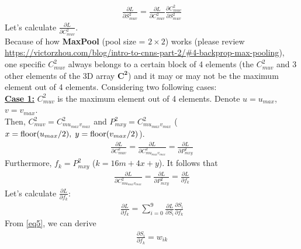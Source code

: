 \documentclass[a4paper,12pt]{article}
\begin{document}
\begin{equation}
\begin{aligned}
\frac{\partial{L}}{\partial{S^2_{muv}}} = \frac{\partial{L}}{\partial{C^2_{muv}}}\frac{\partial{C^2_{muv}}}{\partial{S^2_{muv}}} \label{eq32}
\end{aligned}
\end{equation}
Let's calculate $\frac{\partial{L}}{\partial{C^2_{muv}}}$.\\
Because of how \textbf{MaxPool} (pool size = $2\times2$) works (please review \url{https://victorzhou.com/blog/intro-to-cnns-part-2/#4-backprop-max-pooling}), one specific $C^2_{muv}$ always belongs to a certain block of 4 elements (the $C^2_{muv}$ and 3 other elements of the 3D array $\boldsymbol{C^2}$) and it may or may not be the maximum element out of 4 elements. Considering two following cases:\\[0.5cm]
\underline{\textbf{Case 1:}} $C^2_{muv}$ is the maximum element out of 4 elements. Denote $u = u_{max}$, $v = v_{max}$.\\ 
Then, $C^2_{muv} = C^2_{mu_{max}v_{max}}$ and $P^2_{mxy} = C^2_{mu_{max}v_{max}}$ ($x = \text{floor}(u_{max} / 2),\thickspace y = \text{floor}(v_{max} / 2)$).\\
\begin{equation}
\begin{aligned}
\frac{\partial{L}}{\partial{C^2_{muv}}} = \frac{\partial{L}}{\partial{C^2_{mu_{max}v_{max}}}} = \frac{\partial{L}}{\partial{P^2_{mxy}}} \label{eq33}
\end{aligned}
\end{equation}
Furthermore, $f_k = P^2_{mxy}$ ($k = 16m + 4x + y$). It follows that 
\begin{equation}
\begin{aligned}
\frac{\partial{L}}{\partial{C^2_{mu_{max}v_{max}}}} = \frac{\partial{L}}{\partial{P^2_{mxy}}} = \frac{\partial{L}}{\partial{f_k}} \label{eq34}
\end{aligned}
\end{equation}
Let's calculate $\frac{\partial{L}}{\partial{f_k}}$:
\begin{equation}
\begin{aligned}
\frac{\partial{L}}{\partial{f_k}} = \sum\limits_{i = 0}^{9}\frac{\partial{L}}{\partial{S_i}}\frac{\partial{S_i}}{\partial{f_k}} \label{eq35}
\end{aligned}
\end{equation}
From \eqref{eq5}, we can derive
\begin{equation}
\begin{aligned}
\frac{\partial{S_i}}{\partial{f_k}} = w_{ik} \label{eq36}
\end{aligned}
\end{equation}
\end{document}
